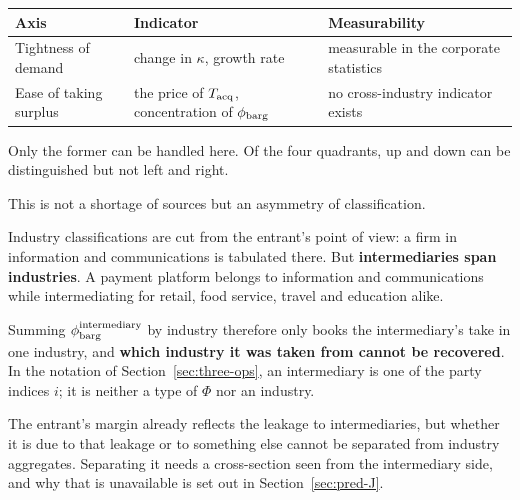 \begin{center}
\begin{tabularx}{\textwidth}{@{}llX@{}}
\toprule
Axis & Indicator & Measurability \\
\midrule
Tightness of demand & change in $\kappa$, growth rate & measurable in the corporate statistics \\
Ease of taking surplus & the price of $T_{\rm acq}$, concentration of $\phi_{\rm barg}$ & no cross-industry indicator exists \\
\bottomrule
\end{tabularx}
\label{tab:hotcold-axes}
\end{center}

Only the former can be handled here. Of the four quadrants, up and down can be distinguished
but not left and right.

\begin{remark}
\label{rem:no-horizontal}
This is not a shortage of sources but an asymmetry of classification.

Industry classifications are cut from the entrant's point of view: a firm in information and
communications is tabulated there. But \textbf{intermediaries span industries}. A payment
platform belongs to information and communications while intermediating for retail, food
service, travel and education alike.

Summing $\phi_{\rm barg}^{\text{intermediary}}$ by industry therefore only books the
intermediary's take in one industry, and \textbf{which industry it was taken from cannot be
recovered}. In the notation of Section~\ref{sec:three-ops}, an intermediary is one of the
party indices $i$; it is neither a type of $\Phi$ nor an industry.

The entrant's margin already reflects the leakage to intermediaries, but whether it is due to
that leakage or to something else cannot be separated from industry aggregates. Separating it
needs a cross-section seen from the intermediary side, and why that is unavailable is set out
in Section~\ref{sec:pred-J}.
\end{remark}


